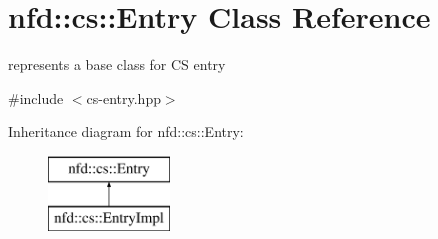 \hypertarget{classnfd_1_1cs_1_1Entry}{}\section{nfd\+:\+:cs\+:\+:Entry Class Reference}
\label{classnfd_1_1cs_1_1Entry}


represents a base class for CS entry  




{\ttfamily \#include $<$cs-\/entry.\+hpp$>$}

Inheritance diagram for nfd\+:\+:cs\+:\+:Entry\+:\begin{figure}[H]
\begin{center}
\leavevmode
\includegraphics[height=2.000000cm]{classnfd_1_1cs_1_1Entry}
\end{center}
\end{figure}
